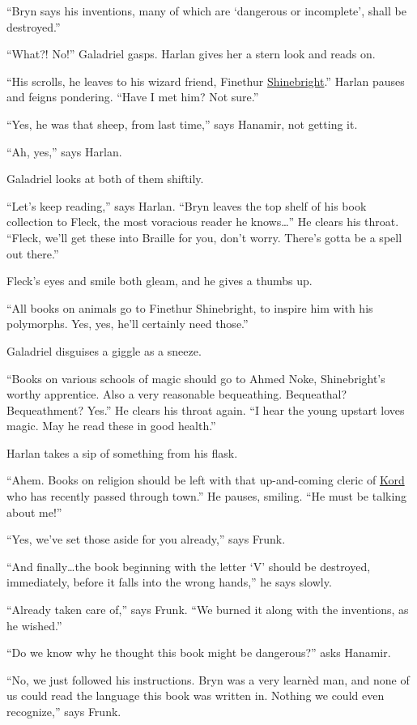 \documentclass[smalldemyvopaper,11pt,twoside,onecolumn,openright,extrafontsizes]{memoir}
\begin{document}
``Bryn says his inventions, many of which are `dangerous or incomplete',
shall be destroyed.''

``What?! No!'' Galadriel gasps. Harlan gives her a stern look and reads
on.

``His scrolls, he leaves to his wizard friend, Finethur
\href{/characters/shinebright/}{Shinebright}.'' Harlan pauses and feigns
pondering. ``Have I met him? Not sure.''

``Yes, he was that sheep, from last time,'' says Hanamir, not getting
it.

``Ah, yes,'' says Harlan.

Galadriel looks at both of them shiftily.

``Let's keep reading,'' says Harlan. ``Bryn leaves the top shelf of his
book collection to Fleck, the most voracious reader he knows\ldots{}''
He clears his throat. ``Fleck, we'll get these into Braille for you,
don't worry. There's gotta be a spell out there.''

Fleck's eyes and smile both gleam, and he gives a thumbs up.

``All books on animals go to Finethur Shinebright, to inspire him with
his polymorphs. Yes, yes, he'll certainly need those.''

Galadriel disguises a giggle as a sneeze.

``Books on various schools of magic should go to Ahmed Noke,
Shinebright's worthy apprentice. Also a very reasonable bequeathing.
Bequeathal? Bequeathment? Yes.'' He clears his throat again. ``I hear
the young upstart loves magic. May he read these in good health.''

Harlan takes a sip of something from his flask.

``Ahem. Books on religion should be left with that up-and-coming cleric
of \href{/characters/kord/}{Kord} who has recently passed through
town.'' He pauses, smiling. ``He must be talking about me!''

``Yes, we've set those aside for you already,'' says Frunk.

``And finally\ldots the book beginning with the letter `V' should be
destroyed, immediately, before it falls into the wrong hands,'' he says
slowly.

``Already taken care of,'' says Frunk. ``We burned it along with the
inventions, as he wished.''

``Do we know why he thought this book might be dangerous?'' asks
Hanamir.

``No, we just followed his instructions. Bryn was a very learnèd man,
and none of us could read the language this book was written in. Nothing
we could even recognize,'' says Frunk.
\end{document}
